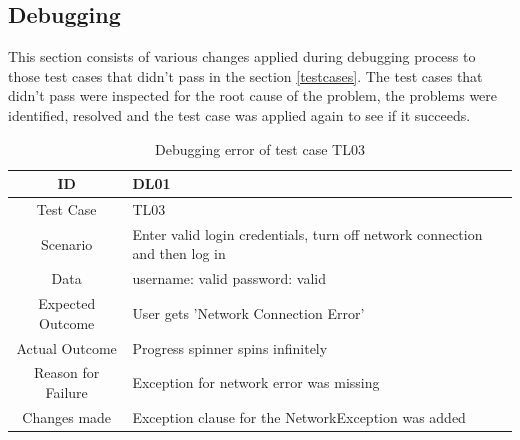 \documentclass[12pt, a4paper, oneside]{article}
\begin{document}
\subsection{Debugging}
This section consists of various changes applied during debugging process to those test cases that didn't pass in the section \ref{testcases}. The test cases that didn't pass were inspected for the root cause of the problem, the problems were identified, resolved and the test case was applied again to see if it succeeds.

\begin{table}[H]
\begin{tabularx}{\linewidth}{|c|X|}
\hline
\rowcolor[HTML]{C0C0C0} 
ID                 & DL01                                                                       \\ \hline
Test Case          & TL03                                                                       \\ \hline
Scenario           & Enter valid login credentials, turn off network connection and then log in \\ \hline
Data               & username: valid  password: valid                                           \\ \hline
Expected Outcome   & User gets 'Network Connection Error'                                       \\ \hline
Actual Outcome     & Progress spinner spins infinitely                                          \\ \hline
Reason for Failure & Exception for network error was missing                                    \\ \hline
Changes made       & Exception clause for the NetworkException was added                        \\ \hline                  
\end{tabularx}
\caption{Debugging error of test case TL03}
\end{table}
\end{document}
